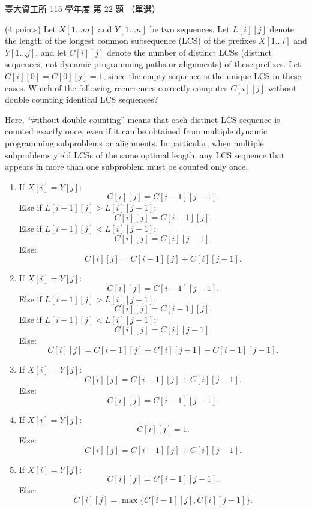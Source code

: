 \begin{pastexam}[label={px:ntu-115-dsa-22}]{臺大資工所 115 學年度 第 22 題}
（單選）

(4 points) Let $X[1\ldots m]$ and $Y[1\ldots n]$ be two sequences. Let $L[i][j]$ denote the length of the longest common subsequence (LCS) of the prefixes $X[1\ldots i]$ and $Y[1\ldots j]$, and let $C[i][j]$ denote the number of distinct LCSs (distinct sequences, not dynamic programming paths or alignments) of these prefixes. Let $C[i][0]=C[0][j]=1$, since the empty sequence is the unique LCS in these cases. Which of the following recurrences correctly computes $C[i][j]$ without double counting identical LCS sequences?

Here, ``without double counting'' means that each distinct LCS sequence is counted exactly once, even if it can be obtained from multiple dynamic programming subproblems or alignments. In particular, when multiple subproblems yield LCSs of the same optimal length, any LCS sequence that appears in more than one subproblem must be counted only once.
\begin{enumerate}[label=(\Alph*)]
\item If $X[i]=Y[j]$: \[C[i][j]=C[i-1][j-1].\]
Else if $L[i-1][j]>L[i][j-1]$: \[C[i][j]=C[i-1][j].\]
Else if $L[i-1][j]<L[i][j-1]$: \[C[i][j]=C[i][j-1].\]
Else: \[C[i][j]=C[i-1][j]+C[i][j-1].\]
\item If $X[i]=Y[j]$: \[C[i][j]=C[i-1][j-1].\]
Else if $L[i-1][j]>L[i][j-1]$: \[C[i][j]=C[i-1][j].\]
Else if $L[i-1][j]<L[i][j-1]$: \[C[i][j]=C[i][j-1].\]
Else: \[C[i][j]=C[i-1][j]+C[i][j-1]-C[i-1][j-1].\]
\item If $X[i]=Y[j]$: \[C[i][j]=C[i-1][j]+C[i][j-1].\]
Else: \[C[i][j]=C[i-1][j-1].\]
\item If $X[i]=Y[j]$: \[C[i][j]=1.\]
Else: \[C[i][j]=C[i-1][j]+C[i][j-1].\]
\item If $X[i]=Y[j]$: \[C[i][j]=C[i-1][j-1].\]
Else: \[C[i][j]=\max\{C[i-1][j],C[i][j-1]\}.\]
\end{enumerate}
\end{pastexam}

